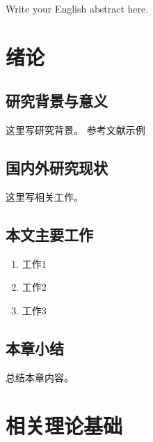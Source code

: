 \documentclass[UTF8,AutoFakeBold=1,AutoFakeSlant,zihao=-4]{SCNU}
\begin{document}
	
	\coverpage
	
	\begin{abstract}
		这里填写中文摘要内容。
		
		要求：
		1. 简要介绍研究背景
		2. 描述提出的方法
		3. 给出实验结果
		4. 总结贡献
	\end{abstract}
	
	\begin{abstractEN}
		Write your English abstract here.
	\end{abstractEN}
	
	\contentpage
	
	
	\section{绪论}
	
	\subsection{研究背景与意义}
	这里写研究背景。
	参考文献示例\cite{rottensteiner2014isprs}
	
	\subsection{国内外研究现状}
	这里写相关工作。
	
	\subsection{本文主要工作}
	\begin{enumerate}
		\item 工作1
		\item 工作2
		\item 工作3
	\end{enumerate}
	
	\subsection{本章小结}
	总结本章内容。
	
	\section{相关理论基础}
	
\end{document}
